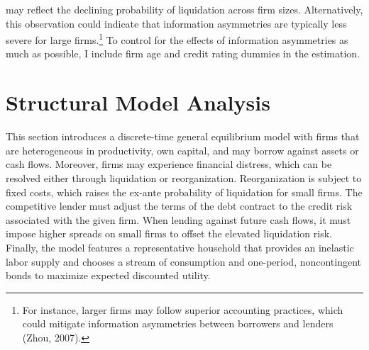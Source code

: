 \documentclass[12pt]{article}
\begin{document}
may reflect the declining probability of liquidation across firm sizes. Alternatively, this observation could indicate that information asymmetries are typically less severe for large firms.\footnote{For instance, larger firms may follow superior accounting practices, which could mitigate information asymmetries between borrowers and lenders (Zhou, 2007).} To control for the effects of information asymmetries as much as possible, I include firm age and credit rating dummies in the estimation.

\section{Structural Model Analysis} \label{sec:model}
This section introduces a discrete-time general equilibrium model with firms that are heterogeneous in productivity, own capital, and may borrow against assets or cash flows. Moreover, firms may experience financial distress, which can be resolved either through liquidation or reorganization. Reorganization is subject to fixed costs, which raises the ex-ante probability of liquidation for small firms. The competitive lender must adjust the terms of the debt contract to the credit risk associated with the given firm. When lending against future cash flows, it must impose higher spreads on small firms to offset the elevated liquidation risk. Finally, the model features a representative household that provides an inelastic labor supply and chooses a stream of consumption and one-period, noncontingent bonds to maximize expected discounted utility.
\end{document}
